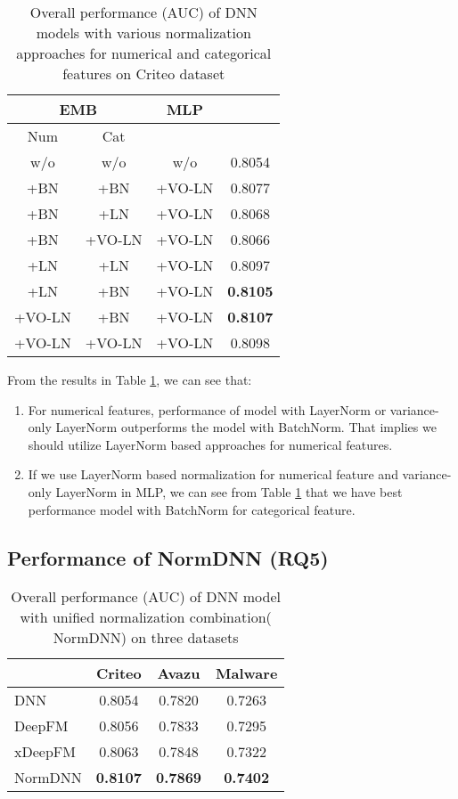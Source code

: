 \documentclass[sigconf]{acmart}
\begin{document}
\begin{table}
  \caption{Overall performance (AUC) of DNN models with various normalization approaches for numerical and categorical features on Criteo dataset}
  \begin{tabular}{cc|c|c}
    \toprule
\multicolumn{2}{c|}{EMB} &
MLP &
\\
\midrule
Num &
Cat &
 & \\
\midrule
w/o & w/o & w/o &
0.8054 \\

+BN &
+BN &
+VO-LN &
0.8077\\
+BN &
+LN &
+VO-LN &
0.8068\\
+BN &
+VO-LN &
+VO-LN &
0.8066\\
+LN &
+LN &
+VO-LN &
0.8097\\
+LN &
+BN &
+VO-LN &
\textbf{0.8105}\\
+VO-LN &
+BN &
+VO-LN &
\textbf{0.8107} \\
+VO-LN &
+VO-LN &
+VO-LN &
0.8098 \\
\bottomrule
  \end{tabular}
  \label{tab:num_cat_criteo}
\end{table}

From the results in Table \ref{tab:num_cat_criteo}, we can see that:
\begin{enumerate}
  \item For numerical features, performance of model with LayerNorm or variance-only LayerNorm outperforms the model with BatchNorm. That implies we should utilize LayerNorm based approaches for numerical features.

  \item If we use LayerNorm based normalization for numerical feature and variance-only LayerNorm in MLP, we can see from Table \ref{tab:num_cat_criteo} that we have best performance model with BatchNorm for categorical feature.
\end{enumerate}


\subsection{Performance of NormDNN (RQ5)}
\begin{table}
  \caption{Overall performance (AUC) of DNN model with unified normalization combination( NormDNN) on three datasets}
  \begin{tabular}{l|ccc}
    \toprule
    &
    Criteo &
    Avazu &
     Malware \\
     \midrule
       DNN &
    0.8054 &
    0.7820 &
    0.7263 \\
       DeepFM &
    0.8056 &
    0.7833 &
    0.7295 \\
      xDeepFM &
    0.8063 &
    0.7848 &
    0.7322 \\
       NormDNN &
    \textbf{0.8107} &
    \textbf{0.7869} &
    \textbf{0.7402} \\
    \bottomrule
  \end{tabular}
  \label{tab:normdnn}
\end{table}
\end{document}
